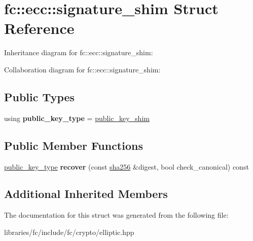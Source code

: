 \hypertarget{structfc_1_1ecc_1_1signature__shim}{}\section{fc\+:\+:ecc\+:\+:signature\+\_\+shim Struct Reference}
\label{structfc_1_1ecc_1_1signature__shim}


Inheritance diagram for fc\+:\+:ecc\+:\+:signature\+\_\+shim\+:


Collaboration diagram for fc\+:\+:ecc\+:\+:signature\+\_\+shim\+:
\subsection*{Public Types}
\begin{DoxyCompactItemize}
\item 
\mbox{\label{structfc_1_1ecc_1_1signature__shim_aab2301026b15825f76b84256f484c5fe}} 
using {\bfseries public\+\_\+key\+\_\+type} = \mbox{\hyperlink{structfc_1_1ecc_1_1public__key__shim}{public\+\_\+key\+\_\+shim}}
\end{DoxyCompactItemize}
\subsection*{Public Member Functions}
\begin{DoxyCompactItemize}
\item 
\mbox{\label{structfc_1_1ecc_1_1signature__shim_aeadd6128a9cb705c2960eeb2f249cfb3}} 
\mbox{\hyperlink{structfc_1_1ecc_1_1public__key__shim}{public\+\_\+key\+\_\+type}} {\bfseries recover} (const \mbox{\hyperlink{classfc_1_1sha256}{sha256}} \&digest, bool check\+\_\+canonical) const
\end{DoxyCompactItemize}
\subsection*{Additional Inherited Members}


The documentation for this struct was generated from the following file\+:\begin{DoxyCompactItemize}
\item 
libraries/fc/include/fc/crypto/elliptic.\+hpp\end{DoxyCompactItemize}
